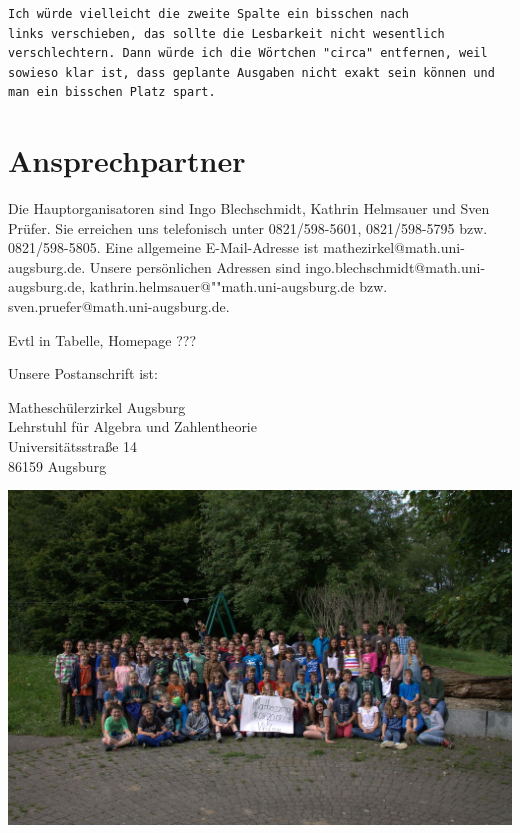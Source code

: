 \documentclass[12pt]{zettel}
\begin{document}
\begin{verbatim}
Ich würde vielleicht die zweite Spalte ein bisschen nach
links verschieben, das sollte die Lesbarkeit nicht wesentlich
verschlechtern. Dann würde ich die Wörtchen "circa" entfernen, weil
sowieso klar ist, dass geplante Ausgaben nicht exakt sein können und
man ein bisschen Platz spart.
\end{verbatim}


\section{Ansprechpartner}

Die Hauptorganisatoren sind Ingo Blechschmidt, Kathrin Helmsauer und Sven
Prüfer. Sie erreichen uns telefonisch unter 0821/598-5601, 0821/598-5795 bzw.
0821/598-5805. Eine allgemeine E-Mail-Adresse ist
\textsf{mathezirkel@math.uni-augsburg.de}. Unsere persönlichen Adressen sind
\textsf{ingo.blechschmidt@math.uni-augsburg.de},
\textsf{kathrin.helmsauer@""math.uni-augsburg.de} bzw.
\textsf{sven.pruefer@math.uni-augsburg.de}.

Evtl in Tabelle, Homepage ???

Unsere Postanschrift ist:
\vspace{-0.5em}
\begin{tabbing}
  {\qquad} Matheschülerzirkel Augsburg \\
  {\qquad} Lehrstuhl für Algebra und Zahlentheorie \\
  {\qquad} Universitätsstraße 14 \\
  {\qquad} 86159 Augsburg
\end{tabbing}

\begin{center}
  \includegraphics[scale=0.3]{gruppenfoto}
\end{center}
\end{document}
